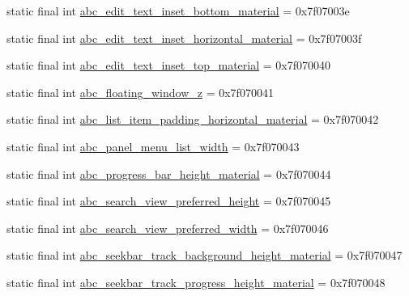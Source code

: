 \begin{CompactItemize}
\item 
static final int \hyperlink{classandroid_1_1support_1_1v7_1_1recyclerview_1_1_r_1_1dimen_71948ea32f9e525fa97e44b84dbcd4a4}{abc\_\-edit\_\-text\_\-inset\_\-bottom\_\-material} = 0x7f07003e
\item 
static final int \hyperlink{classandroid_1_1support_1_1v7_1_1recyclerview_1_1_r_1_1dimen_8db5e19065e2d3e6b34c8d0310b2d0e8}{abc\_\-edit\_\-text\_\-inset\_\-horizontal\_\-material} = 0x7f07003f
\item 
static final int \hyperlink{classandroid_1_1support_1_1v7_1_1recyclerview_1_1_r_1_1dimen_0150e620a79ea4acb3a160d33a599ac0}{abc\_\-edit\_\-text\_\-inset\_\-top\_\-material} = 0x7f070040
\item 
static final int \hyperlink{classandroid_1_1support_1_1v7_1_1recyclerview_1_1_r_1_1dimen_80905fdefa19014214c0d5bd73ba5a6c}{abc\_\-floating\_\-window\_\-z} = 0x7f070041
\item 
static final int \hyperlink{classandroid_1_1support_1_1v7_1_1recyclerview_1_1_r_1_1dimen_73e76e7c6efe72b0f150587ee6c1b5b3}{abc\_\-list\_\-item\_\-padding\_\-horizontal\_\-material} = 0x7f070042
\item 
static final int \hyperlink{classandroid_1_1support_1_1v7_1_1recyclerview_1_1_r_1_1dimen_5b99295bfb1b6e4d598424c3cfc4c43b}{abc\_\-panel\_\-menu\_\-list\_\-width} = 0x7f070043
\item 
static final int \hyperlink{classandroid_1_1support_1_1v7_1_1recyclerview_1_1_r_1_1dimen_8a2111cc6a53a31797c13e6f68dfa216}{abc\_\-progress\_\-bar\_\-height\_\-material} = 0x7f070044
\item 
static final int \hyperlink{classandroid_1_1support_1_1v7_1_1recyclerview_1_1_r_1_1dimen_b2e7ae1e04ce0f070a1e45d763dddcf5}{abc\_\-search\_\-view\_\-preferred\_\-height} = 0x7f070045
\item 
static final int \hyperlink{classandroid_1_1support_1_1v7_1_1recyclerview_1_1_r_1_1dimen_605c417773ce0fa01c8ec878ff3b2bb3}{abc\_\-search\_\-view\_\-preferred\_\-width} = 0x7f070046
\item 
static final int \hyperlink{classandroid_1_1support_1_1v7_1_1recyclerview_1_1_r_1_1dimen_019b4cf647ec8f3be1e2c1662ce5060d}{abc\_\-seekbar\_\-track\_\-background\_\-height\_\-material} = 0x7f070047
\item 
static final int \hyperlink{classandroid_1_1support_1_1v7_1_1recyclerview_1_1_r_1_1dimen_8a6694a4a16b8af7e6b0e73f4373bb90}{abc\_\-seekbar\_\-track\_\-progress\_\-height\_\-material} = 0x7f070048
\item 

\end{CompactItemize}

